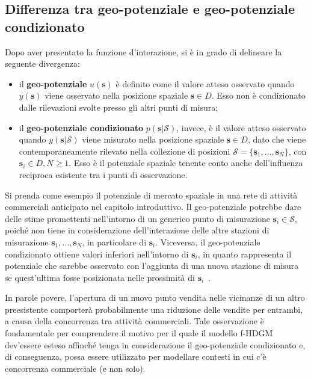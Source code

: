 \subsection[Differenza tra geo-potenziale e geo-potenziale condizionato]{Differenza tra geo-potenziale e geo-potenziale condizionato}
Dopo aver presentato la funzione d'interazione, si è in grado di delineare la seguente divergenza:
\begin{itemize}
	\item il \textbf{geo-potenziale} $u(\mathbf{s})$ è definito come il valore atteso osservato quando $y(\mathbf{s})$ viene osservato nella posizione spaziale $\mathbf{s} \in D$. Esso non è condizionato dalle rilevazioni svolte presso gli altri punti di misura;
	\item il \textbf{geo-potenziale condizionato} $p(\mathbf{s}|\mathcal{S})$, invece, è il valore atteso osservato quando $y(\mathbf{s}| \mathcal{S})$
	viene misurato nella posizione spaziale $\mathbf{s} \in D$, dato che viene contemporaneamente rilevato nella collezione di posizioni $\mathcal{S} = \{\mathbf{s}_1, \ldots, \mathbf{s}_N\}$,  con $\mathbf{s}_i \in D, N \geq 1$. Esso è il potenziale spaziale tenente conto anche dell'influenza reciproca esistente tra i punti di osservazione.
\end{itemize}
Si prenda come esempio il potenziale di mercato spaziale in  una rete di attività commerciali anticipato nel capitolo introduttivo. Il geo-potenziale potrebbe dare delle stime promettenti nell'intorno di un generico punto di misurazione $\mathbf{s}_i \in\mathcal{S}$, poiché non tiene in considerazione dell'interazione delle altre stazioni di misurazione $\mathbf{s}_1, \ldots, \mathbf{s}_N$, in particolare di $\mathbf{s}_i$. Viceversa, il geo-potenziale condizionato ottiene valori inferiori nell'intorno di $\mathbf{s}_i$, in quanto rappresenta il potenziale che sarebbe osservato con l'aggiunta di una  nuova stazione di misura se quest'ultima fosse posizionata nelle prossimità di $\mathbf{s}_i$~\citep{paper_GPM}.\par In parole povere, l'apertura di un nuovo punto vendita nelle vicinanze di un altro preesistente comporterà probabilmente una riduzione delle vendite per entrambi, a causa della concorrenza tra attività commerciali. Tale osservazione è fondamentale per comprendere il motivo per il quale il modello f-HDGM dev'essere esteso affinché tenga in considerazione il geo-potenziale condizionato e, di conseguenza, possa essere utilizzato per modellare contesti in cui c'è concorrenza commerciale (e non solo).

